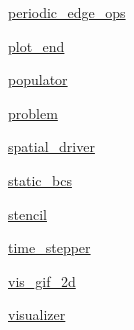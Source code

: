 \begin{DoxyCompactItemize}
\item 
 \hyperlink{namespaceMain__PDE__Repo_1_1src_1_1periodic__edge__ops}{periodic\+\_\+edge\+\_\+ops}
\item 
 \hyperlink{namespaceMain__PDE__Repo_1_1src_1_1plot__end}{plot\+\_\+end}
\item 
 \hyperlink{namespaceMain__PDE__Repo_1_1src_1_1populator}{populator}
\item 
 \hyperlink{namespaceMain__PDE__Repo_1_1src_1_1problem}{problem}
\item 
 \hyperlink{namespaceMain__PDE__Repo_1_1src_1_1spatial__driver}{spatial\+\_\+driver}
\item 
 \hyperlink{namespaceMain__PDE__Repo_1_1src_1_1static__bcs}{static\+\_\+bcs}
\item 
 \hyperlink{namespaceMain__PDE__Repo_1_1src_1_1stencil}{stencil}
\item 
 \hyperlink{namespaceMain__PDE__Repo_1_1src_1_1time__stepper}{time\+\_\+stepper}
\item 
 \hyperlink{namespaceMain__PDE__Repo_1_1src_1_1vis__gif__2d}{vis\+\_\+gif\+\_\+2d}
\item 
 \hyperlink{namespaceMain__PDE__Repo_1_1src_1_1visualizer}{visualizer}
\end{DoxyCompactItemize}
